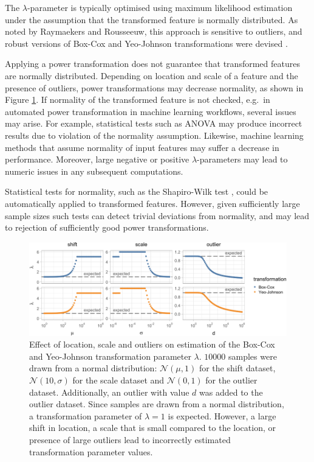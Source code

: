 \documentclass[preprint,12pt,authoryear]{elsarticle}
\begin{document}
The \(\lambda\)-parameter is typically optimised using maximum
likelihood estimation under the assumption that the transformed feature
is normally distributed. As noted by Raymaekers and Rousseeuw, this
approach is sensitive to outliers, and robust versions of Box-Cox and
Yeo-Johnson transformations were devised \citep{Raymaekers2024-zf}.

Applying a power transformation does not guarantee that transformed
features are normally distributed. Depending on location and scale of a
feature and the presence of outliers, power transformations may decrease
normality, as shown in Figure \ref{fig:decreased-normality}. If
normality of the transformed feature is not checked, e.g.~in automated
power transformation in machine learning workflows, several issues may
arise. For example, statistical tests such as ANOVA may produce
incorrect results due to violation of the normality assumption.
Likewise, machine learning methods that assume normality of input
features may suffer a decrease in performance. Moreover, large negative
or positive \(\lambda\)-parameters may lead to numeric issues in any
subsequent computations.

Statistical tests for normality, such as the Shapiro-Wilk test
\citep{Shapiro1965-zd}, could be automatically applied to transformed features.
However, given sufficiently large sample sizes such tests can detect
trivial deviations from normality, and may lead to rejection of
sufficiently good power transformations.

\begin{figure}

{\centering \includegraphics[width=1\linewidth]{figure_1} 

}

\caption{Effect of location, scale and outliers on estimation of the Box-Cox and Yeo-Johnson transformation parameter $\lambda$. $10000$ samples were drawn from a normal distribution: $\mathcal{N}(\mu, 1)$ for the shift dataset, $\mathcal{N}(10, \sigma)$ for the scale dataset and $\mathcal{N}(0, 1)$ for the outlier dataset. Additionally, an outlier with value $d$ was added to the outlier dataset. Since samples are drawn from a normal distribution, a transformation parameter of $\lambda = 1$ is expected. However, a large shift in location, a scale that is small compared to the location, or presence of large outliers lead to incorrectly estimated transformation parameter values.}\label{fig:decreased-normality}
\end{figure}
\end{document}
